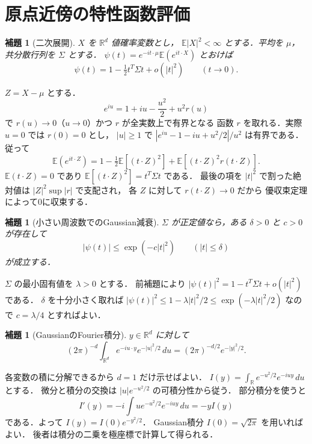 \documentclass[a5paper,10pt,onecolumn]{jsarticle}
\makeatletter
\theoremstyle{mathnotetheorem}
\newtheorem{lemma}[theorem]{補題}
\renewcommand{\proofname}{証明}
\renewenvironment{proof}[1][\proofname]{%
  \par\pushQED{\qed}\normalfont\topsep4\p@\@plus2\p@\relax
  \trivlist\item[\hskip\labelsep\bfseries #1]\ignorespaces
}{\popQED\endtrivlist\@endpefalse}
\makeatother
\begin{document}
\section{原点近傍の特性函数評価}
\begin{lemma}[二次展開]\label{lem:tay}
$X$ を $\mathbb R^d$ 値確率変数とし，
$\mathbb E|X|^2<\infty$ とする．平均を $\mu$，
共分散行列を $\Sigma$ とする．
$\psi(t)=e^{-it\cdot\mu}\mathbb E(e^{it\cdot X})$
とおけば
\[
 \psi(t)=1-\tfrac12t^T\Sigma t+o(|t|^2)
 \qquad(t\longrightarrow0).
\]
\end{lemma}
\begin{proof}
$Z=X-\mu$ とする．
\[
 e^{iu}=1+iu-\frac{u^2}{2}+u^2r(u)
\]
で $r(u)\to0$（$u\to0$）かつ $r$ が全実数上で有界となる
函数 $r$ を取れる．実際 $u=0$ では $r(0)=0$ とし，
$|u|\ge1$ で $|e^{iu}-1-iu+u^2/2|/u^2$ は有界である．
従って
\[
 \mathbb E(e^{it\cdot Z})
 =1-\tfrac12\mathbb E[(t\cdot Z)^2]
  +\mathbb E[(t\cdot Z)^2r(t\cdot Z)].
\]
$\mathbb E(t\cdot Z)=0$ であり
$\mathbb E[(t\cdot Z)^2]=t^T\Sigma t$ である．
最後の項を $|t|^2$ で割った絶対値は
$|Z|^2\sup|r|$ で支配され，
各 $Z$ に対して $r(t\cdot Z)\to0$ だから
優収束定理によって0に収束する．
\end{proof}

\begin{lemma}[小さい周波数でのGaussian減衰]\label{lem:bound}
$\Sigma$ が正定値なら，ある $\delta>0$ と $c>0$ が存在して
\[
 |\psi(t)|\le\exp(-c|t|^2)\qquad(|t|\le\delta)
\]
が成立する．
\end{lemma}
\begin{proof}
$\Sigma$ の最小固有値を $\lambda>0$ とする．
前補題により
$|\psi(t)|^2=1-t^T\Sigma t+o(|t|^2)$ である．
$\delta$ を十分小さく取れば
$|\psi(t)|^2\le1-\lambda|t|^2/2
\le\exp(-\lambda|t|^2/2)$ なので
$c=\lambda/4$ とすればよい．
\end{proof}

\begin{lemma}[GaussianのFourier積分]\label{lem:gauss}
$y\in\mathbb R^d$ に対して
\[
 (2\pi)^{-d}\int_{\mathbb R^d}
     e^{-iu\cdot y}e^{-|u|^2/2}\,du
       =(2\pi)^{-d/2}e^{-|y|^2/2}.
\]
\end{lemma}
\begin{proof}
各変数の積に分解できるから $d=1$ だけ示せばよい．
$I(y)=\int_{\mathbb R}e^{-u^2/2}e^{-iuy}\,du$ とする．
微分と積分の交換は $|u|e^{-u^2/2}$ の可積分性から従う．
部分積分を使うと
\[
 I'(y)=-i\int ue^{-u^2/2}e^{-iuy}\,du=-yI(y)
\]
である．よって $I(y)=I(0)e^{-y^2/2}$．
Gaussian積分 $I(0)=\sqrt{2\pi}$ を用いればよい．
後者は積分の二乗を極座標で計算して得られる．
\end{proof}
\end{document}
